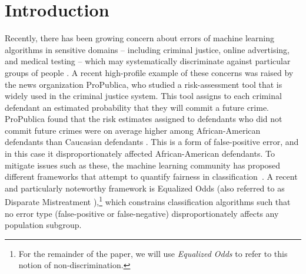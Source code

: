 \section{Introduction}

Recently, there has been growing concern about errors of machine learning algorithms in sensitive domains -- including criminal justice, online advertising, and
medical testing \cite{whitehouse-big-data} -- which may systematically discriminate against
particular groups of people \cite{barocas2016big,berk2017fairness,chouldechova2017fair}.
%
%
A recent high-profile example of these concerns was raised by the
news organization ProPublica, who studied a risk-assessment tool
that is widely used in the criminal justice system.
This tool assigns to each criminal defendant an estimated probability
that they will commit a future crime.
ProPublica found that the risk estimates assigned to
defendants who did not commit future crimes were on average
higher among African-American defendants than Caucasian defendants \cite{angwin-propublica-risk-scores}.
This is a form of false-positive error, and in this case it
disproportionately affected African-American defendants.
%
To mitigate issues such as these,
the machine learning community has proposed different
frameworks that attempt to quantify fairness in classification~\cite{barocas2016big,berk2017fairness,chouldechova2017fair,hardt2016equality,kleinberg2016inherent,woodworth2017learning,zafar2017fairness}.
A recent and particularly noteworthy framework is Equalized Odds \cite{hardt2016equality}
(also referred to as Disparate Mistreatment \cite{zafar2017fairness}),\footnote{
  For the remainder of the paper, we will use \emph{Equalized Odds}
  to refer to this notion of non-discrimination.
}
which constrains classification algorithms such that no error type (false-positive
or false-negative) disproportionately affects any population subgroup.
